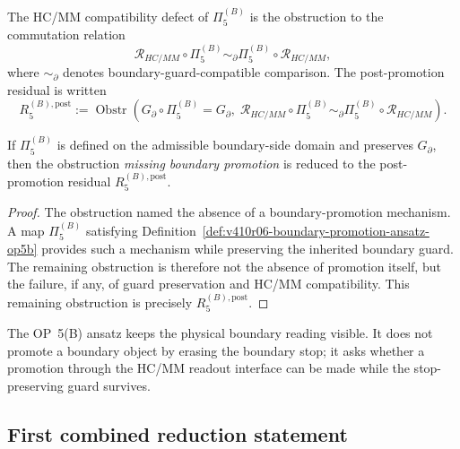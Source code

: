 \begin{definition}
\label{def:v410r06-hc-mm-compatibility-defect}
The HC/MM compatibility defect of \(\Pi_{5}^{(B)}\) is the obstruction to the
commutation relation
\[
 \mathcal R_{HC/MM}\circ \Pi_{5}^{(B)}
 \sim_{\partial}
 \Pi_{5}^{(B)}\circ \mathcal R_{HC/MM},
\]
where \(\sim_{\partial}\) denotes boundary-guard-compatible comparison. The
post-promotion residual is written
\[
 R_{5}^{(B),\mathrm{post}}
 :=
 \operatorname{Obstr}\left(
 G_{\partial}\circ \Pi_{5}^{(B)}=G_{\partial},
 \;
 \mathcal R_{HC/MM}\circ \Pi_{5}^{(B)}
 \sim_{\partial}
 \Pi_{5}^{(B)}\circ \mathcal R_{HC/MM}
 \right).
\]
\end{definition}

\begin{lemma}
\label{lem:v410r06-boundary-promotion-ansatz-reduces-op5b-obstruction}
If \(\Pi_{5}^{(B)}\) is defined on the admissible boundary-side domain and
preserves \(G_{\partial}\), then the obstruction \emph{missing boundary
promotion} is reduced to the post-promotion residual
\(R_{5}^{(B),\mathrm{post}}\).
\end{lemma}

\begin{proof}
The obstruction named the absence of a boundary-promotion mechanism. A
map \(\Pi_{5}^{(B)}\) satisfying Definition~\ref{def:v410r06-boundary-promotion-ansatz-op5b}
provides such a mechanism while preserving the inherited boundary guard. The
remaining obstruction is therefore not the absence of promotion itself, but the
failure, if any, of guard preservation and HC/MM compatibility. This remaining
obstruction is precisely \(R_{5}^{(B),\mathrm{post}}\).
\end{proof}

\begin{remark}
\label{rem:v410r06-op5b-physical-reading}
The OP~5(B) ansatz keeps the physical boundary reading visible. It does not
promote a boundary object by erasing the boundary stop; it asks whether a
promotion through the HC/MM readout interface can be made while the
stop-preserving guard survives.
\end{remark}

\subsection{First combined reduction statement}
\label{subsec:v410r06-first-combined-reduction-statement}

